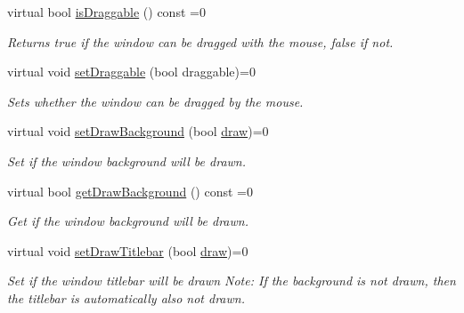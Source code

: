 \begin{DoxyCompactItemize}
virtual bool \hyperlink{classirr_1_1gui_1_1IGUIWindow_a466621df62d0dd97eb008efd3d31d4d9}{is\+Draggable} () const =0
\begin{DoxyCompactList}\small\item\em Returns true if the window can be dragged with the mouse, false if not. \end{DoxyCompactList}\item 
\mbox{\label{classirr_1_1gui_1_1IGUIWindow_aeec78bc610444411cafd5925ab7650a7}} 
virtual void \hyperlink{classirr_1_1gui_1_1IGUIWindow_aeec78bc610444411cafd5925ab7650a7}{set\+Draggable} (bool draggable)=0
\begin{DoxyCompactList}\small\item\em Sets whether the window can be dragged by the mouse. \end{DoxyCompactList}\item 
\mbox{\label{classirr_1_1gui_1_1IGUIWindow_a76f7d790554c6bd60b601a64a4127169}} 
virtual void \hyperlink{classirr_1_1gui_1_1IGUIWindow_a76f7d790554c6bd60b601a64a4127169}{set\+Draw\+Background} (bool \hyperlink{classirr_1_1gui_1_1IGUIElement_a1ef7eeaff67b8a9f4f37cacdc7e54be2}{draw})=0
\begin{DoxyCompactList}\small\item\em Set if the window background will be drawn. \end{DoxyCompactList}\item 
\mbox{\label{classirr_1_1gui_1_1IGUIWindow_a6a7720d558220d29125bc494961f4463}} 
virtual bool \hyperlink{classirr_1_1gui_1_1IGUIWindow_a6a7720d558220d29125bc494961f4463}{get\+Draw\+Background} () const =0
\begin{DoxyCompactList}\small\item\em Get if the window background will be drawn. \end{DoxyCompactList}\item 
\mbox{\label{classirr_1_1gui_1_1IGUIWindow_ae8fa25bf5eec28b8fd663f2e3856200b}} 
virtual void \hyperlink{classirr_1_1gui_1_1IGUIWindow_ae8fa25bf5eec28b8fd663f2e3856200b}{set\+Draw\+Titlebar} (bool \hyperlink{classirr_1_1gui_1_1IGUIElement_a1ef7eeaff67b8a9f4f37cacdc7e54be2}{draw})=0
\begin{DoxyCompactList}\small\item\em Set if the window titlebar will be drawn Note\+: If the background is not drawn, then the titlebar is automatically also not drawn. \end{DoxyCompactList}\item 

\end{DoxyCompactItemize}

